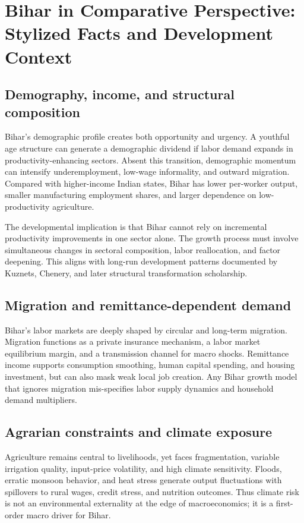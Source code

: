 \documentclass[preprint,12pt]{elsarticle}
\begin{document}
\section{Bihar in Comparative Perspective: Stylized Facts and Development Context}
\subsection{Demography, income, and structural composition}
Bihar's demographic profile creates both opportunity and urgency. A youthful age structure can generate a demographic dividend if labor demand expands in productivity-enhancing sectors. Absent this transition, demographic momentum can intensify underemployment, low-wage informality, and outward migration. Compared with higher-income Indian states, Bihar has lower per-worker output, smaller manufacturing employment shares, and larger dependence on low-productivity agriculture.

The developmental implication is that Bihar cannot rely on incremental productivity improvements in one sector alone. The growth process must involve simultaneous changes in sectoral composition, labor reallocation, and factor deepening. This aligns with long-run development patterns documented by Kuznets, Chenery, and later structural transformation scholarship.

\subsection{Migration and remittance-dependent demand}
Bihar's labor markets are deeply shaped by circular and long-term migration. Migration functions as a private insurance mechanism, a labor market equilibrium margin, and a transmission channel for macro shocks. Remittance income supports consumption smoothing, human capital spending, and housing investment, but can also mask weak local job creation. Any Bihar growth model that ignores migration mis-specifies labor supply dynamics and household demand multipliers.

\subsection{Agrarian constraints and climate exposure}
Agriculture remains central to livelihoods, yet faces fragmentation, variable irrigation quality, input-price volatility, and high climate sensitivity. Floods, erratic monsoon behavior, and heat stress generate output fluctuations with spillovers to rural wages, credit stress, and nutrition outcomes. Thus climate risk is not an environmental externality at the edge of macroeconomics; it is a first-order macro driver for Bihar.
\end{document}
